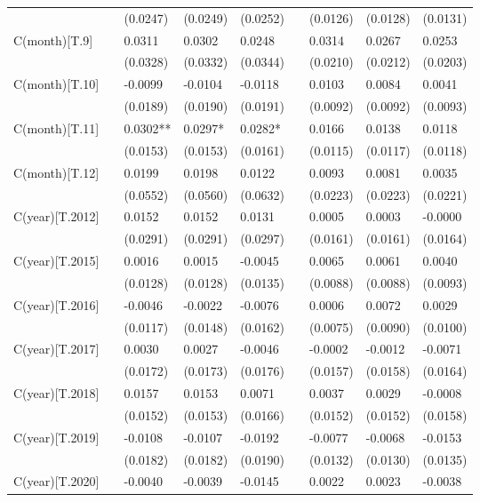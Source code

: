 \begin{tabular}{lllllllll}
 &  & (0.0247) & (0.0249) & (0.0252) &  & (0.0126) & (0.0128) & (0.0131) \\
C(month)[T.9] &  & 0.0311 & 0.0302 & 0.0248 &  & 0.0314 & 0.0267 & 0.0253 \\
 &  & (0.0328) & (0.0332) & (0.0344) &  & (0.0210) & (0.0212) & (0.0203) \\
C(month)[T.10] &  & -0.0099 & -0.0104 & -0.0118 &  & 0.0103 & 0.0084 & 0.0041 \\
 &  & (0.0189) & (0.0190) & (0.0191) &  & (0.0092) & (0.0092) & (0.0093) \\
C(month)[T.11] &  & 0.0302** & 0.0297* & 0.0282* &  & 0.0166 & 0.0138 & 0.0118 \\
 &  & (0.0153) & (0.0153) & (0.0161) &  & (0.0115) & (0.0117) & (0.0118) \\
C(month)[T.12] &  & 0.0199 & 0.0198 & 0.0122 &  & 0.0093 & 0.0081 & 0.0035 \\
 &  & (0.0552) & (0.0560) & (0.0632) &  & (0.0223) & (0.0223) & (0.0221) \\
C(year)[T.2012] &  & 0.0152 & 0.0152 & 0.0131 &  & 0.0005 & 0.0003 & -0.0000 \\
 &  & (0.0291) & (0.0291) & (0.0297) &  & (0.0161) & (0.0161) & (0.0164) \\
C(year)[T.2015] &  & 0.0016 & 0.0015 & -0.0045 &  & 0.0065 & 0.0061 & 0.0040 \\
 &  & (0.0128) & (0.0128) & (0.0135) &  & (0.0088) & (0.0088) & (0.0093) \\
C(year)[T.2016] &  & -0.0046 & -0.0022 & -0.0076 &  & 0.0006 & 0.0072 & 0.0029 \\
 &  & (0.0117) & (0.0148) & (0.0162) &  & (0.0075) & (0.0090) & (0.0100) \\
C(year)[T.2017] &  & 0.0030 & 0.0027 & -0.0046 &  & -0.0002 & -0.0012 & -0.0071 \\
 &  & (0.0172) & (0.0173) & (0.0176) &  & (0.0157) & (0.0158) & (0.0164) \\
C(year)[T.2018] &  & 0.0157 & 0.0153 & 0.0071 &  & 0.0037 & 0.0029 & -0.0008 \\
 &  & (0.0152) & (0.0153) & (0.0166) &  & (0.0152) & (0.0152) & (0.0158) \\
C(year)[T.2019] &  & -0.0108 & -0.0107 & -0.0192 &  & -0.0077 & -0.0068 & -0.0153 \\
 &  & (0.0182) & (0.0182) & (0.0190) &  & (0.0132) & (0.0130) & (0.0135) \\
C(year)[T.2020] &  & -0.0040 & -0.0039 & -0.0145 &  & 0.0022 & 0.0023 & -0.0038 \\

\end{tabular}
